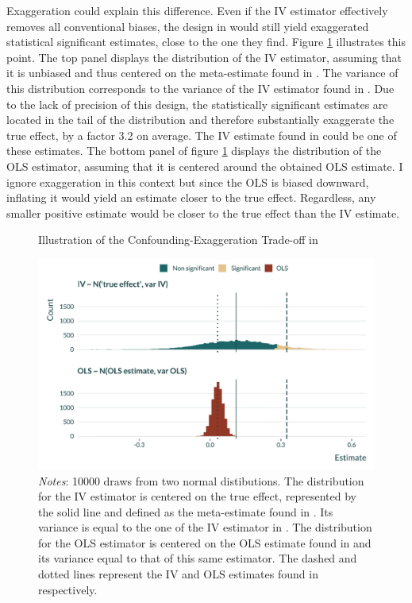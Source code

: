 \documentclass[usletter, 12pt]{article}
\begin{document}
		Exaggeration could explain this difference. Even if the IV estimator effectively removes all conventional biases, the design in \cite{he_straw_2020} would still yield exaggerated statistical significant estimates, close to the one they find. Figure \ref{graph_he} illustrates this point. The top panel displays the distribution of the IV estimator, assuming that it is unbiased and thus centered on the meta-estimate found in \cite{shah_short_2015}. The variance of this distribution corresponds to the variance of the IV estimator found in \cite{he_straw_2020}. Due to the lack of precision of this design, the statistically significant estimates are located in the tail of the distribution and therefore substantially exaggerate the true effect, by a factor 3.2 on average. The IV estimate found in \cite{he_straw_2020} could be one of these estimates. The bottom panel of figure \ref{graph_he} displays the distribution of the OLS estimator, assuming that it is centered around the obtained OLS estimate. I ignore exaggeration in this context but since the OLS is biased downward, inflating it would yield an estimate closer to the true effect. Regardless, any smaller positive estimate would be closer to the true effect than the IV estimate. 
				
		\begin{figure}[!h]
                   	\caption{Illustration of the Confounding-Exaggeration Trade-off in \cite{he_straw_2020}}
                        \label{graph_he}
                    	\centering
                    	\includegraphics[width=0.8\linewidth]{images/graph_he.pdf}
                   	 \caption*{\footnotesize \textnormal{\textit{Notes}:  10000 draws from two normal distibutions. The distribution for the IV estimator is centered on the true effect, represented by the solid line and defined as the meta-estimate found in \cite{shah_short_2015}. Its variance is equal to the one of the IV estimator in \cite{he_straw_2020}. The distribution for the OLS estimator is centered on the OLS estimate found in \cite{he_straw_2020} and its variance equal to that of this same estimator. The dashed and dotted lines represent the IV and OLS estimates found in \cite{he_straw_2020} respectively.}}
                \end{figure}
				
\end{document}
